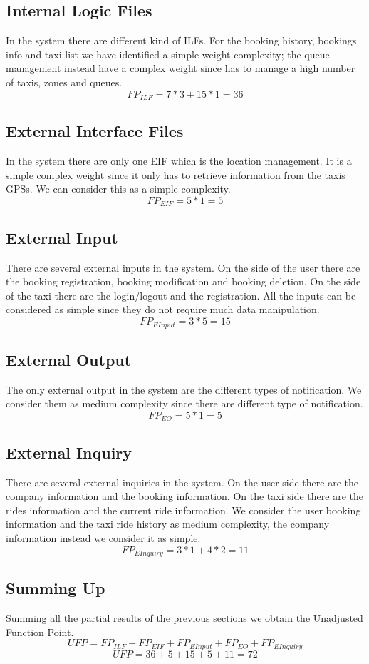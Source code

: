 \subsection{Internal Logic Files}
In the system there are different kind of ILFs. For the booking history, bookings info and taxi list we have identified a simple weight complexity; the queue management instead have a complex weight since has to manage a high number of taxis, zones and queues.
$$FP_{ILF}=7*3+15*1=36$$
\subsection{External Interface Files}
In the system there are only one EIF which is the location management. It is a simple complex weight since it only has to retrieve information from the taxis GPSs. We can consider this as a simple complexity.$$FP_{EIF}=5*1=5$$
\subsection{External Input}
There are several external inputs in the system. On the side of the user there are the booking registration, booking modification and booking deletion. On the side of the taxi there are the login/logout and the registration. All the inputs can be considered as simple since they do not require much data manipulation. $$FP_{EInput}=3*5=15$$
\subsection{External Output}
The only external output in the system are the different types of notification. We consider them as medium complexity since there are different type of notification. $$FP_{EO}=5*1=5$$
\subsection{External Inquiry}
There are several external inquiries in the system. On the user side there are the company information and the booking information. On the taxi side there are the rides information and the current ride information. We consider the user booking information and the taxi ride history as medium complexity, the company information instead we consider it as simple. $$FP_{EInquiry}=3*1+4*2=11$$

\subsection{Summing Up}
Summing all the partial results of the previous sections we obtain the Unadjusted Function Point.
$$UFP=FP_{ILF}+FP_{EIF}+FP_{EInput}+FP_{EO}+FP_{EInquiry}$$ $$UFP=36+5+15+5+11=72$$